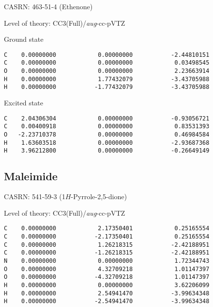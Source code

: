 \documentclass[journal=jctcce,manuscript=article,layout=traditional]{achemso}
\newcommand{\AVTZ}{\emph{aug}-cc-pVTZ}
\begin{document}
CASRN: 463-51-4 (Ethenone)

\begin{singlespace}
\noindent   Level of theory: CC3(Full)/{\AVTZ}
\end{singlespace}

\begin{singlespace}
\noindent Ground state
\begin{verbatim}
C    0.00000000            0.00000000           -2.44810151
C    0.00000000            0.00000000            0.03498545
O    0.00000000            0.00000000            2.23663914
H    0.00000000            1.77432079           -3.43705988
H    0.00000000           -1.77432079           -3.43705988
\end{verbatim}
\end{singlespace}

\begin{singlespace}
\noindent Excited state
\begin{verbatim}
C    2.04306304            0.00000000           -0.93056721
C    0.00400918            0.00000000            0.83531393
O   -2.23710378            0.00000000            0.46984584
H    1.63603518            0.00000000           -2.93687368
H    3.96212800            0.00000000           -0.26649149
\end{verbatim}
\end{singlespace}

\subsection{Maleimide}

CASRN: 541-59-3 (1$H$-Pyrrole-2,5-dione)

\begin{singlespace}
\noindent  Level of theory: CC3(Full)/{\AVTZ}
\begin{verbatim}
C    0.00000000            2.17350401            0.25165554
C    0.00000000           -2.17350401            0.25165554
C    0.00000000            1.26218315           -2.42188951
C    0.00000000           -1.26218315           -2.42188951
N    0.00000000            0.00000000            1.72344743
O    0.00000000            4.32709218            1.01147397
O    0.00000000           -4.32709218            1.01147397
H    0.00000000            0.00000000            3.62206099
H    0.00000000            2.54941470           -3.99634348
H    0.00000000           -2.54941470           -3.99634348
\end{verbatim}
\end{singlespace}
\end{document}
